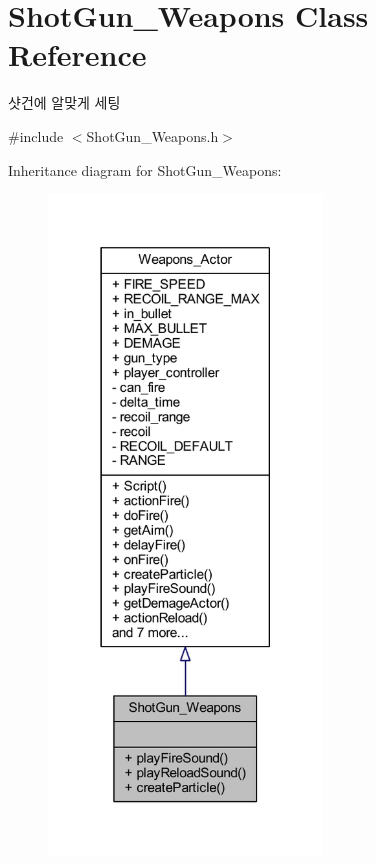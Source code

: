 \hypertarget{class_shot_gun___weapons}{}\section{Shot\+Gun\+\_\+\+Weapons Class Reference}
\label{class_shot_gun___weapons}


샷건에 알맞게 세팅  




{\ttfamily \#include $<$Shot\+Gun\+\_\+\+Weapons.\+h$>$}



Inheritance diagram for Shot\+Gun\+\_\+\+Weapons\+:\nopagebreak
\begin{figure}[H]
\begin{center}
\leavevmode
\includegraphics[width=206pt]{class_shot_gun___weapons__inherit__graph}
\end{center}
\end{figure}


